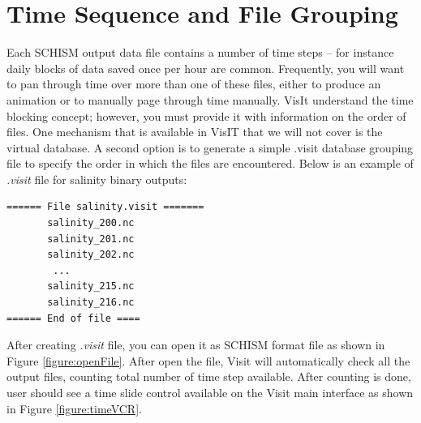 \documentclass[12pt]{report}
\begin{document}
\section{Time Sequence and File Grouping}
\label{sec:time}
Each SCHISM output data file contains a number of time steps -- for instance daily blocks of data saved once per hour are common.
Frequently, you will want to pan through time over more than one of these files, either to produce an animation
or to manually page through time manually. VisIt understand the time blocking concept; however, you must provide it
with information on the order of files. One mechanism that is available in VisIT that we will not cover is the virtual database.
A second option is to generate a simple .visit database grouping file to specify the order in which the files are encountered. Below is an example of \emph{.visit} file for salinity binary outputs:

\begin{verbatim}
====== File salinity.visit =======
       salinity_200.nc
       salinity_201.nc
       salinity_202.nc
        ... 
       salinity_215.nc
       salinity_216.nc
====== End of file ====
\end{verbatim}
				
After creating \emph{.visit} file, you can open it as SCHISM format file as shown in Figure \ref{figure:openFile}. After open the file, Visit will automatically check all the output files, counting total number of time step available. After counting is done, user should see a time slide control available on the Visit main interface as shown in Figure \ref{figure:timeVCR}.
\end{document}
